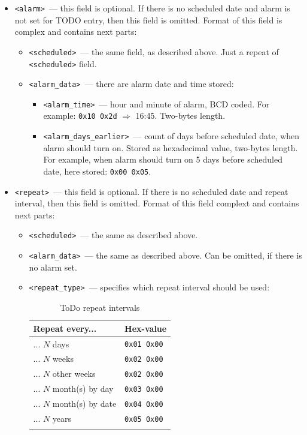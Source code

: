 \documentclass[a4paper,12pt,oneside]{scrartcl}
\begin{document}
\begin{itemize}
\item \texttt{<alarm>}~--- this field is optional. If there is no scheduled
  date and alarm is not set for TODO entry, then this field is omitted. Format
  of this field is complex and contains next parts:
  \begin{itemize}
  \item \texttt{<scheduled>}~--- the same field, as described above. Just a
    repeat of \texttt{<scheduled>} field.
  \item \texttt{<alarm\_data>}~--- there are alarm date and time stored:
    \begin{itemize}
    \item \texttt{<alarm\_time>}~--- hour and minute of alarm, BCD coded. For
      example: \texttt{0x10 0x2d} $\Rightarrow$ 16:45. Two-bytes length.
    \item \texttt{<alarm\_days\_earlier>}~--- count of days before scheduled
      date, when alarm should turn on. Stored as hexadecimal value, two-bytes
      length. For example, when alarm should turn on 5 days before scheduled
      date, here stored: \texttt{0x00 0x05}.
    \end{itemize}
  \end{itemize}

\item \texttt{<repeat>}~--- this field is optional. If there is no scheduled
  date and repeat interval, then this field is omitted. Format of this field
  complext and contains next parts:
  \begin{itemize}
  \item \texttt{<scheduled>}~--- the same as described above.
  \item \texttt{<alarm\_data>}~--- the same as described above. Can be omitted,
    if there is no alarm set.
  \item \texttt{<repeat\_type>}~--- specifies which repeat interval should be
    used:
    \begin{longtable}[H]{|l|l|}
      \hline
      \textbf{Repeat every...} & \textbf{Hex-value} \\
      \hline
      ... $N$ days & \texttt{0x01 0x00} \\
      \hline
      ... $N$ weeks & \texttt{0x02 0x00} \\
      \hline
      ... $N$ other weeks & \texttt{0x02 0x00} \\
      \hline
      ... $N$ month(s) by day & \texttt{0x03 0x00} \\
      \hline
      ... $N$ month(s) by date & \texttt{0x04 0x00} \\
      \hline
      ... $N$ years & \texttt{0x05 0x00} \\
      \hline
      \caption{ToDo repeat intervals}
      \label{tab:todo-repeat-intervals}
    \end{longtable}


\end{itemize}
\end{itemize}
\end{document}
